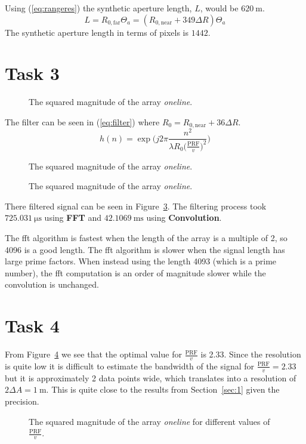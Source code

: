 \documentclass[12pt,a4paper]{article}
\begin{document}
Using (\ref{eq:rangeres}) the synthetic aperture length, $L$, would be $\SI{620}{\metre}$.
\begin{equation}
  \label{eq:rangeres}
  L = R_{0,\text{far}}\Theta_a= (R_{0,\text{near}}+349\Delta R)\Theta_a
\end{equation}
The synthetic aperture length in terms of pixels is $1442$.

\section{Task 3}
\begin{figure}[ht!]
  \centering
  \noindent\makebox[\textwidth]{\scalebox{0.90}{}}
  \caption{The squared magnitude of the array \textit{oneline}.}
  \label{fig:task3_ut}
\end{figure}
The filter can be seen in (\ref{eq:filter}) where $R_0=R_{0,\text{near}}+36\Delta R$.
\begin{equation}
  \label{eq:filter}
  h(n) = \exp\Bigg(j2\pi\frac{n^2}{\lambda R_0\big(\frac{\text{PRF}}{v}\big)^2}\Bigg)
\end{equation}
\begin{figure}[ht!]
  \centering
  \noindent\makebox[\textwidth]{\scalebox{0.90}{}}
  \caption{The squared magnitude of the array \textit{oneline}.}
  \label{fig:task3_ut}
\end{figure}
\begin{figure}[ht!]
  \centering
  \noindent\makebox[\textwidth]{\scalebox{0.90}{}}
  \caption{The squared magnitude of the array \textit{oneline}.}
  \label{fig:task3_filter_ut}
\end{figure}

There filtered signal can be seen in Figure~\ref{fig:task3_filter_ut}. The filtering process took $\SI{725.031}{\micro\second}$ using \textbf{FFT} and $\SI{42.1069}{\milli\second}$ using \textbf{Convolution}.

The fft algorithm is fastest when the length of the array is a multiple of 2, so 4096 is a good length. The fft algorithm is slower when the signal length has large prime factors. When instead using the length 4093 (which is a prime number), the fft computation is an order of magnitude slower while the convolution is unchanged.

\section{Task 4}
From Figure~\ref{fig:task4_ut} we see that the optimal value for $\frac{\text{PRF}}{v}$ is 2.33. Since the resolution is quite low it is difficult to estimate the bandwidth of the signal for $\frac{\text{PRF}}{v}=2.33$ but it is approximately 2 data points wide, which translates into a resolution of $2\Delta A = \SI{1}{\metre}$. This is quite close to the results from Section~\ref{sec:1} given the precision.
\begin{figure}[ht!]
  \centering
  \noindent\makebox[\textwidth]{\scalebox{0.90}{}}
  \caption{The squared magnitude of the array \textit{oneline} for different values of $\frac{\text{PRF}}{v}$.}
  \label{fig:task4_ut}
\end{figure}
\end{document}
